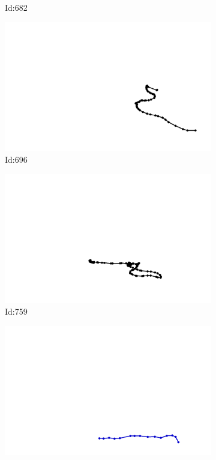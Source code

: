 \documentclass[12pt,twoside]{report}
\begin{document}
\begin{figure}
\begin{subfigure}[b]{0.20\textwidth}
\caption{Id:682}
\end{subfigure}
\begin{subfigure}[b]{0.20\textwidth}
\centering
\includegraphics[width=\textwidth]{../trajectories/696.png}
\caption{Id:696}
\end{subfigure}
\begin{subfigure}[b]{0.20\textwidth}
\centering
\includegraphics[width=\textwidth]{../trajectories/759.png}
\caption{Id:759}
\end{subfigure}
\begin{subfigure}[b]{0.20\textwidth}
\centering
\includegraphics[width=\textwidth]{../trajectories/791.png}

\end{subfigure}
\end{figure}
\end{document}
